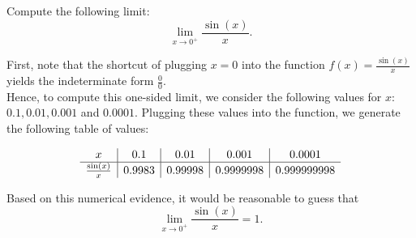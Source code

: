 \documentclass{ximera}
\begin{document}
\begin{example}[example 5]
Compute the following limit: 
\[\lim_{x \to 0^+} \frac{\sin(x)}{x}.\]

First, note that the shortcut of plugging $x=0$ into the 
function $\displaystyle{f(x)= \frac{\sin(x)}{x}}$ yields the indeterminate form $\frac{0}{0}$.\\
Hence, to compute this one-sided limit, we consider the following values for $x$: $0.1, 0.01, 0.001$ and $0.0001$.
Plugging these values into the function, we generate the following table of values:

\[
\begin{array}{ c | c | c | c | c }
  x & 0.1 & 0.01  & 0.001 & 0.0001 \\ 
	\hline 
	 \frac{\sin(x)}{x} & 0.9983 & 0.99998 & 0.9999998 & 0.999999998
\end{array}
\]  

Based on this numerical evidence, 
it would be reasonable to guess that 
\[\lim_{x \to 0^{+}} \frac{\sin(x)}{x} = 1.\]













\end{example}

	   
\end{document}
